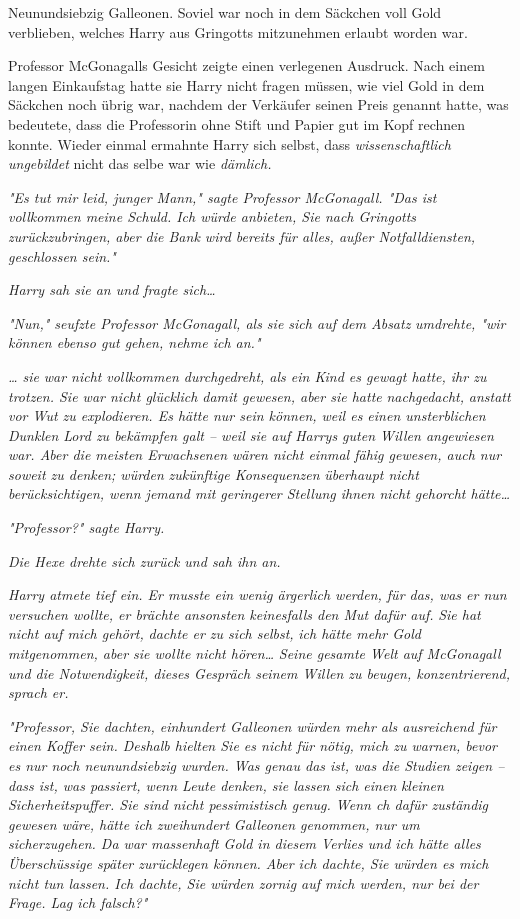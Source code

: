 {Neunundsiebzig Galleonen. Soviel war noch in dem Säckchen voll Gold verblieben, welches Harry aus Gringotts mitzunehmen erlaubt worden war.

Professor McGonagalls Gesicht zeigte einen verlegenen Ausdruck. Nach einem langen Einkaufstag hatte sie Harry nicht fragen müssen, wie viel Gold in dem Säckchen noch übrig war, nachdem der Verkäufer seinen Preis genannt hatte, was bedeutete, dass die Professorin ohne Stift und Papier gut im Kopf rechnen konnte. Wieder einmal ermahnte Harry sich selbst, dass \emph{wissenschaftlich ungebildet} nicht das selbe war wie \emph{dämlich.}

\emph{"Es tut mir leid, junger Mann," sagte Professor McGonagall. "Das ist vollkommen meine Schuld. Ich würde anbieten, Sie nach Gringotts zurückzubringen, aber die Bank wird bereits für alles, außer Notfalldiensten, geschlossen sein."}

\emph{Harry sah sie an und fragte sich…}

\emph{"Nun," seufzte Professor McGonagall, als sie sich auf dem Absatz} \emph{umdrehte, "wir können ebenso gut gehen, nehme ich an."}

\emph{… sie} \emph{\emph{war nicht}} \emph{vollkommen durchgedreht, als ein Kind es gewagt hatte, ihr zu trotzen. Sie war nicht glücklich damit gewesen, aber sie hatte} \emph{\emph{nachgedacht,}} \emph{anstatt vor Wut zu explodieren. Es hätte nur sein können, weil es einen unsterblichen Dunklen Lord zu bekämpfen galt -- weil sie auf Harrys guten Willen angewiesen war. Aber die meisten Erwachsenen wären nicht einmal fähig gewesen, auch nur soweit zu denken; würden} \emph{\emph{zukünftige Konsequenzen}} \emph{überhaupt nicht berücksichtigen, wenn jemand mit geringerer Stellung ihnen nicht gehorcht hätte…}

\emph{"Professor?" sagte Harry.}

\emph{Die Hexe drehte sich zurück und sah ihn an.}

\emph{Harry atmete tief ein. Er musste ein wenig ärgerlich werden, für das, was er nun versuchen wollte, er brächte ansonsten keinesfalls den Mut dafür auf.} \emph{\emph{Sie hat nicht auf mich gehört,}} \emph{dachte er zu sich selbst,} \emph{\emph{ich hätte mehr Gold mitgenommen, aber sie wollte nicht hören…}} \emph{Seine gesamte Welt auf McGonagall und die Notwendigkeit, dieses Gespräch seinem Willen zu beugen, konzentrierend, sprach er.}

\emph{"Professor, Sie dachten, einhundert Galleonen würden mehr als ausreichend für einen Koffer sein. Deshalb hielten Sie es nicht für nötig, mich zu warnen, bevor es nur noch neunundsiebzig wurden. Was genau das ist, was die Studien zeigen -- dass ist, was passiert, wenn Leute denken, sie lassen sich einen} \emph{\emph{kleinen}} \emph{Sicherheitspuffer. Sie sind nicht pessimistisch genug. Wenn ch dafür zuständig gewesen wäre, hätte ich} \emph{\emph{zweihundert}} \emph{Galleonen genommen, nur um sicherzugehen. Da war massenhaft Gold in diesem Verlies und ich hätte alles Überschüssige später zurücklegen können. Aber ich dachte, Sie würden es mich nicht tun lassen. Ich dachte, Sie würden zornig auf mich werden, nur bei der Frage. Lag ich falsch?"}

}
